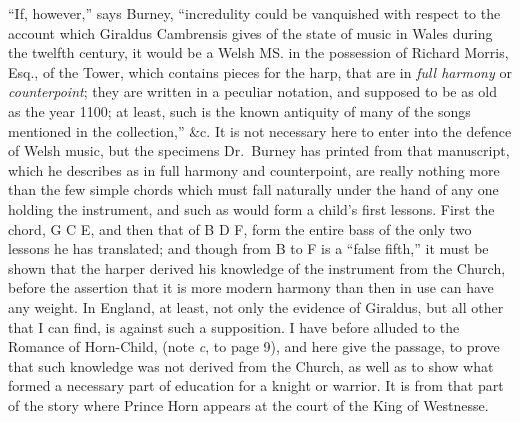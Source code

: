 \renewcommand\versoheader{harpers not taught by monks.}
\renewcommand\rectoheader{character of tunes often derived from instruments.}

“If, however,” says Burney, “incredulity could be vanquished with respect to
the account which Giraldus Cambrensis gives of the state of music in Wales
during the twelfth century, it would be a Welsh MS. in the possession of Richard
Morris, Esq., of the Tower, which contains pieces for the harp, that are in \textit{full
harmony} or \textit{counterpoint}; they are written in a peculiar notation, and supposed
to be as old as the year 1100; at least, such is the known antiquity of many of
the songs mentioned in the collection,” \&c. It is not necessary here to enter
into the defence of Welsh music, but the specimens Dr.~Burney has printed from
that manuscript, which he describes as in full harmony and counterpoint, are
really nothing more than the few simple chords which must fall naturally under
the hand of any one holding the instrument, and such as would form a child’s
first lessons. First the chord, G C E, and then that of B D F, form the entire
bass of the only two lessons he has translated; and though from B to F is
a “false fifth,” it must be shown that the harper derived his knowledge of
the instrument from the Church, before the assertion that it is more modern
harmony than then in use can have any weight. In England, at least, not
only the evidence of Giraldus, but all other that I can find, is against such a
supposition. I have before alluded to the Romance of Horn-Child, (note \textit{c}, to
page 9), and here give the passage, to prove that such knowledge was not
derived from the Church, as well as to show what formed a necessary part of
education for a knight or warrior. It is from that part of the story where
Prince Horn appears at the court of the King of Westnesse.

